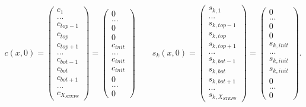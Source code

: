 \begin{equation}
    c(x,0) = \left(\begin{matrix}  c_1\\ ...\\c_{top-1}\\c_{top}\\c_{top+1}\\...\\c_{bot-1}\\c_{bot}\\c_{bot+1}\\
    ...\\ c_{X_{STEPS}} \end{matrix}\right) = \left(\begin{matrix}  0\\ ...\\0\\0\\c_{init}\\...\\c_{init}\\c_{init}\\0\\
    ...\\ 0 \end{matrix}\right) \qquad 
    s_k(x,0) = \left(\begin{matrix}  s_{k,1}\\ ...\\s_{k, top-1}\\s_{k, top}\\s_{k, top+1}\\...\\s_{k, bot-1}\\s_{k, bot}\\s_{k, bot+1}\\
    ...\\ s_{k, X_{STEPS}} \end{matrix}\right) = \left(\begin{matrix} 0\\ ...\\0\\0\\s_{k, init}\\...\\s_{k, init}\\s_{k, init}\\0\\
    ...\\ 0 \end{matrix}\right).
    \label{eq:init_cond}
\end{equation}
